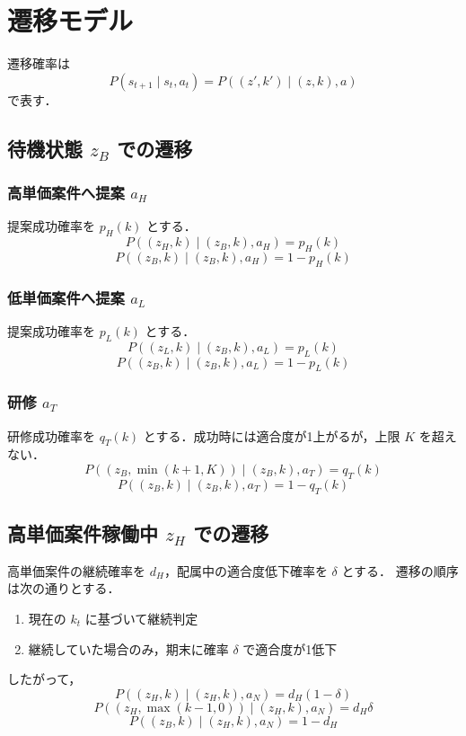 \documentclass[11pt,a4paper]{bxjsarticle}
\begin{document}
\section{遷移モデル}

遷移確率は
\[
    P(s_{t+1}\mid s_t,a_t)=P((z',k')\mid(z,k),a)
\]
で表す．

\subsection{待機状態 \(z_B\) での遷移}

\subsubsection{高単価案件へ提案 \(a_H\)}

提案成功確率を \(p_H(k)\) とする．
\[
    P((z_H,k)\mid(z_B,k),a_H)=p_H(k)
\]
\[
    P((z_B,k)\mid(z_B,k),a_H)=1-p_H(k)
\]

\subsubsection{低単価案件へ提案 \(a_L\)}

提案成功確率を \(p_L(k)\) とする．
\[
    P((z_L,k)\mid(z_B,k),a_L)=p_L(k)
\]
\[
    P((z_B,k)\mid(z_B,k),a_L)=1-p_L(k)
\]

\subsubsection{研修 \(a_T\)}

研修成功確率を \(q_T(k)\) とする．成功時には適合度が1上がるが，上限 \(K\) を超えない．
\[
    P((z_B,\min(k+1,K))\mid(z_B,k),a_T)=q_T(k)
\]
\[
    P((z_B,k)\mid(z_B,k),a_T)=1-q_T(k)
\]

\subsection{高単価案件稼働中 \(z_H\) での遷移}

高単価案件の継続確率を \(d_H\)，配属中の適合度低下確率を \(\delta\) とする．
遷移の順序は次の通りとする．
\begin{enumerate}[leftmargin=2em,label=(\arabic*)]
    \item 現在の \(k_t\) に基づいて継続判定
    \item 継続していた場合のみ，期末に確率 \(\delta\) で適合度が1低下
\end{enumerate}

したがって，
\[
    P((z_H,k)\mid(z_H,k),a_N)=d_H(1-\delta)
\]
\[
    P((z_H,\max(k-1,0))\mid(z_H,k),a_N)=d_H\delta
\]
\[
    P((z_B,k)\mid(z_H,k),a_N)=1-d_H
\]
\end{document}

